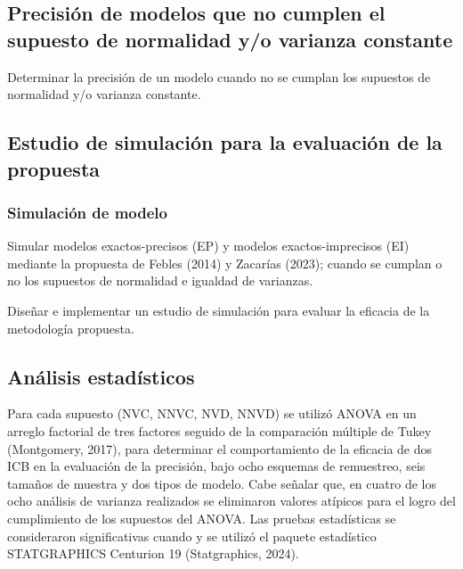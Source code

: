 	 
	 
	 
	 
	 \subsection{Precisión de modelos que no cumplen el supuesto de normalidad y/o varianza constante}
	 Determinar la precisión de un modelo cuando no se cumplan los supuestos de normalidad y/o varianza constante.
	 \vspace{1.5cm}
	 	 
	 	 
	 \subsection{Estudio de simulación para la evaluación de la propuesta}
	 \vspace{1.5cm}
	
	 \subsubsection{Simulación de modelo}
	 Simular modelos exactos-precisos (EP) y modelos exactos-imprecisos (EI) mediante la propuesta de Febles (2014) y Zacarías (2023); cuando se cumplan o no los supuestos de normalidad e igualdad de varianzas.
	 
	 Diseñar e implementar un estudio de simulación para evaluar la eficacia de la metodología propuesta.
	 	 \vspace{1.5cm}
	 	 
	 	 
	 	 
	 	 
\subsection{Análisis estadísticos}
Para cada supuesto (NVC, NNVC, NVD, NNVD) se utilizó ANOVA en un arreglo factorial de tres factores seguido de la comparación múltiple de Tukey (Montgomery, 2017), para determinar el comportamiento de la eficacia de dos ICB en la evaluación de la precisión, bajo ocho esquemas de remuestreo, seis tamaños de muestra y dos tipos de modelo. Cabe señalar que, en cuatro de los ocho análisis de varianza realizados se eliminaron valores atípicos para el logro del cumplimiento de los supuestos del ANOVA.
Las pruebas estadísticas se consideraron significativas cuando  y se utilizó el paquete estadístico STATGRAPHICS Centurion 19 (Statgraphics, 2024).




